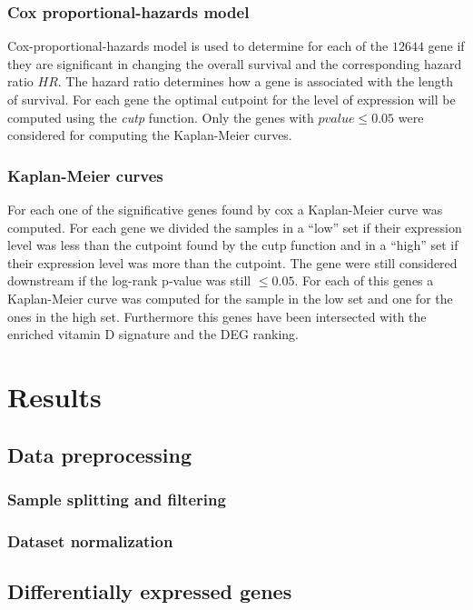 \documentclass[fleqn,10pt]{SelfArx} %
\begin{document}
		\subsubsection{Cox proportional-hazards model}
		Cox-proportional-hazards model is used to determine for each of the $12644$ gene if they are significant in changing the overall survival and the corresponding hazard ratio $HR$.
		The hazard ratio determines how a gene is associated with the length of survival.
		For each gene the optimal cutpoint for the level of expression will be computed using the \emph{cutp} function.
		Only the genes with $pvalue \le 0.05$ were considered for computing the Kaplan-Meier curves.

		\subsubsection{Kaplan-Meier curves}
		For each one of the significative genes found by cox a Kaplan-Meier curve was computed.
		For each gene we divided the samples in a ``low'' set if their expression level was less than the cutpoint found by the cutp function and in a ``high'' set if their expression level was more than the cutpoint.
		The gene were still considered downstream if the log-rank p-value was still $\le0.05$.
		For each of this genes a Kaplan-Meier curve was computed for the sample in the low set and one for the ones in the high set.
		Furthermore this genes have been intersected with the enriched vitamin D signature and the DEG ranking.

\section{Results}

	\subsection{Data preprocessing}

		\subsubsection{Sample splitting and filtering}

		\subsubsection{Dataset normalization}

	\subsection{Differentially expressed genes}
\end{document}

